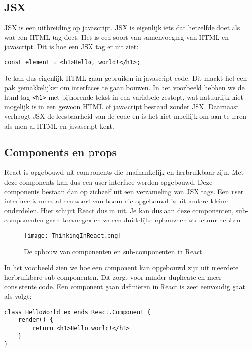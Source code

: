 \subsection{JSX}
\label{subsec:jsx}
JSX is een uitbreiding op javascript. JSX is eigenlijk iets dat hetzelfde doet als wat een HTML tag doet. Het is een soort van samenvoeging van HTML en javascript. Dit is hoe een JSX tag er uit ziet: 

\begin{lstlisting}[frame=single, caption=Voorbeeld van een JSX tag]
const element = <h1>Hello, world!</h1>;
\end{lstlisting}

Je kan dus eigenlijk HTML gaan gebruiken in javascript code. Dit maakt het een pak gemakkelijker om interfaces te gaan bouwen. In het voorbeeld hebben we de html tag \lstinline[basicstyle=\ttfamily\color{red}]|<h1>| met bijhorende tekst in een variabele gestopt, wat natuurlijk niet mogelijk is in een gewoon HTML of javascript bestand zonder JSX. Daarnaast verhoogt JSX de leesbaarheid van de code en is het niet moeilijk om aan te leren als men al HTML en javascript kent.

\subsection{Components en props}
\label{subsec:components-en-props}
React is opgebouwd uit components die onafhankelijk en herbruikbaar zijn. Met deze components kan dus een user interface worden opgebouwd. Deze components bestaan dan op zichzelf uit een verzameling van JSX tags. Een user interface is meestal een soort van boom die opgebouwd is uit andere kleine onderdelen. Hier schijnt React dus in uit. Je kan dus aan deze componenten, sub-componenten gaan toevoegen en zo een duidelijke opbouw en structuur hebben.

\begin{figure}
	\centering
	\texttt{[image: ThinkingInReact.png]}
	\caption{De opbouw van componenten en sub-componenten in React.}
	\label{fig:ar-vs-vr}
\end{figure}

In het voorbeeld zien we hoe een component kan opgebouwd zijn uit meerdere herbruikbare sub-componenten. Dit zorgt voor minder duplicate en meer consistente code. Een component gaan definiëren in React is zeer eenvoudig gaat als volgt:

\begin{lstlisting}[frame=single, caption=Het component HelloWorld wordt gedefinieerd]
class HelloWorld extends React.Component {
	render() {
		return <h1>Hello world!</h1>
	}
}
\end{lstlisting}

